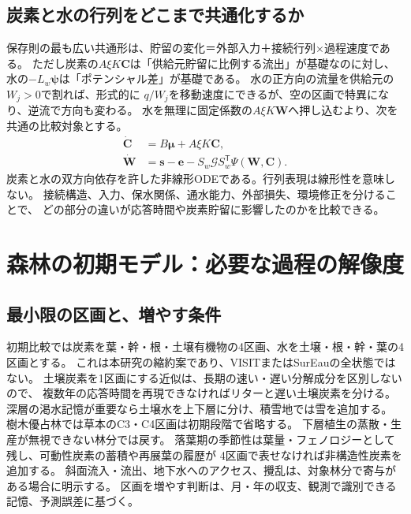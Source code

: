 \documentclass[a4paper,11pt]{ltjsarticle}
\newcommand{\trans}{^{\mathsf T}}
\begin{document}
\subsection{炭素と水の行列をどこまで共通化するか}
保存則の最も広い共通形は、貯留の変化＝外部入力＋接続行列×過程速度である。
ただし炭素の$A\xi K\bm C$は「供給元貯留に比例する流出」が基礎なのに対し、
水の$-L_w\bm\psi$は「ポテンシャル差」が基礎である。
水の正方向の流量を供給元の$W_j>0$で割れば、形式的に
$q/W_j$を移動速度にできるが、空の区画で特異になり、逆流で方向も変わる。
水を無理に固定係数の$A\xi K\bm W$へ押し込むより、次を共通の比較対象とする。
\begin{equation}
\boxed{\begin{aligned}
\dot{\bm C}&=B\bm\mu+A\xi K\bm C,\\
\dot{\bm W}&=\bm s-\bm e-S_w\mathcal G S_w\trans\Psi(\bm W,\bm C).
\end{aligned}}\label{eq:joint}
\end{equation}
炭素と水の双方向依存を許した非線形ODEである。行列表現は線形性を意味しない。
接続構造、入力、保水関係、通水能力、外部損失、環境修正を分けることで、
どの部分の違いが応答時間や炭素貯留に影響したのかを比較できる。

\section{森林の初期モデル：必要な過程の解像度}
\subsection{最小限の区画と、増やす条件}
初期比較では炭素を葉・幹・根・土壌有機物の4区画、水を土壌・根・幹・葉の4区画とする。
これは本研究の縮約案であり、VISITまたはSurEauの全状態ではない。
土壌炭素を1区画にする近似は、長期の速い・遅い分解成分を区別しないので、
複数年の応答時間を再現できなければリターと遅い土壌炭素を分ける。
深層の渇水記憶が重要なら土壌水を上下層に分け、積雪地では雪を追加する。
樹木優占林では草本のC3・C4区画は初期段階で省略する。
下層植生の蒸散・生産が無視できない林分では戻す。
落葉期の季節性は葉量・フェノロジーとして残し、可動性炭素の蓄積や再展葉の履歴が
4区画で表せなければ非構造性炭素を追加する。
斜面流入・流出、地下水へのアクセス、攪乱は、対象林分で寄与がある場合に明示する。
区画を増やす判断は、月・年の収支、観測で識別できる記憶、予測誤差に基づく。
\end{document}
